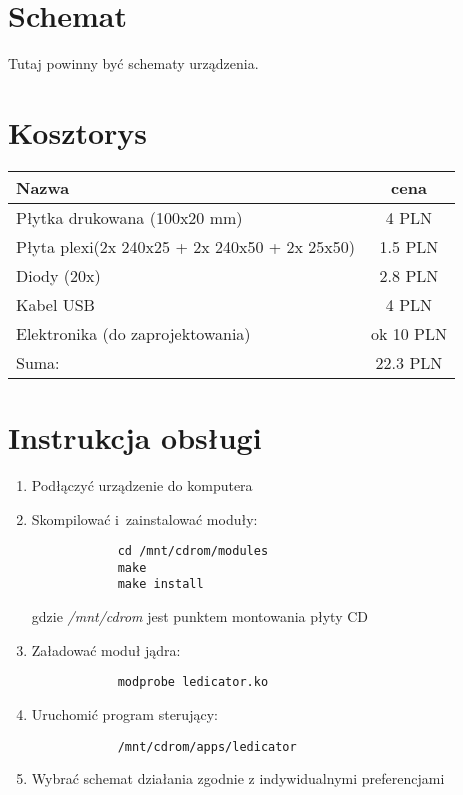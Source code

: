 \documentclass[a4paper,12pt]{article}
\begin{document}
\section{Schemat}
	Tutaj powinny być schematy urządzenia.
\section{Kosztorys}
	\begin{tabular}{|l|c|}
	\hline
	\textbf{Nazwa}&\textbf{cena}\\
	\hline
	Płytka drukowana (100x20 mm)&4 PLN\\
	Płyta plexi(2x 240x25 + 2x 240x50 + 2x 25x50)&1.5 PLN\\
	Diody (20x)&2.8 PLN\\
	Kabel USB&4 PLN\\
	Elektronika (do zaprojektowania)& ok 10 PLN\\
	\hline
	Suma:&22.3 PLN\\
	\hline
	\end{tabular}
\newpage
\section{Instrukcja obsługi}
	\begin{enumerate}
		\item Podłączyć urządzenie do komputera
		\item Skompilować i~zainstalować moduły:
			\begin{verbatim}
			cd /mnt/cdrom/modules
			make
			make install
			\end{verbatim}
			gdzie \textit{/mnt/cdrom} jest punktem montowania płyty CD
		\item Załadować moduł jądra:
			\begin{verbatim}
			modprobe ledicator.ko
			\end{verbatim}
		\item Uruchomić program sterujący:
			\begin{verbatim}
			/mnt/cdrom/apps/ledicator
			\end{verbatim}
		\item Wybrać schemat działania zgodnie z indywidualnymi preferencjami
	\end{enumerate}
\end{document}
